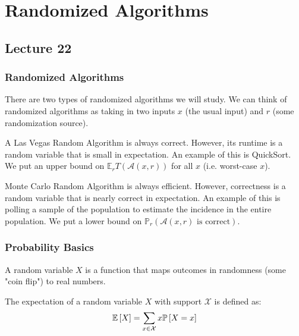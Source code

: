 \section{Randomized Algorithms}
\subsection{Lecture 22}
\subsubsection{Randomized Algorithms}

There are two types of randomized algorithms we will study.
We can think of randomized algorithms as taking in two inputs $x$ (the usual input) and $r$ (some randomization source).

\begin{definition}
    A Las Vegas Random Algorithm is always correct. However, its runtime is a random variable that is small in expectation. An example of this is QuickSort. We put an upper bound on $\mathbb{E}_r{T(\mathcal{A}(x, r))}$ for all $x$ (i.e. worst-case $x$).
\end{definition}

\begin{definition}
    Monte Carlo Random Algorithm is always efficient. However, correctness is a random variable that is nearly correct in expectation. An example of this is polling a sample of the population to estimate the incidence in the entire population. We put a lower bound on $\mathbb{P}_r(\mathcal{A}(x, r) \text{ is correct})$.
\end{definition}

\subsubsection{Probability Basics}

\begin{definition}
    A random variable $X$ is a function that maps outcomes in randomness (some "coin flip") to real numbers.
\end{definition}

\begin{definition}[Expectation]
    The expectation of a random variable $X$ with support $\mathcal{X}$ is defined as:
    \[ \mathbb{E}\left[ X \right] = \sum_{x \in \mathcal{X}} x \mathbb{P}\left[ X = x \right] \]
\end{definition}

